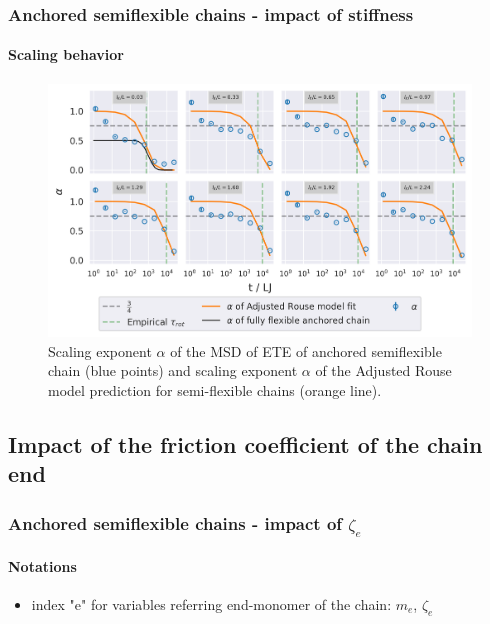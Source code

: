 \documentclass[handout]{beamer}
\begin{document}
\begin{frame}
    \frametitle{Anchored semiflexible chains - impact of stiffness}
    \framesubtitle{Scaling behavior}
    \begin{figure}[h]
        \begin{center}
          \includegraphics[width=\columnwidth,trim={0cm 0cm 0cm 0.0cm},clip]{4-exp-delta_R-rouse_fit-tau-a_alpha.png}
          \caption{\label{fig:alpha_anchored_l_K}
          Scaling exponent $\alpha$ of the MSD of ETE of anchored semiflexible chain (blue points) and 
          scaling exponent $\alpha$ of the Adjusted Rouse model prediction for semi-flexible chains 
          (orange line).
          }
        \end{center}
    \end{figure}
\end{frame}

\subsection{Impact of the friction coefficient of the chain end}


\begin{frame}
    \frametitle{Anchored semiflexible chains - impact of $\zeta_e$}
    \framesubtitle{Notations}
    \begin{itemize}
        \item index "e" for variables referring end-monomer of the chain: $m_e$, $\zeta_e$ 
    \end{itemize}
\end{frame}

\end{document}
